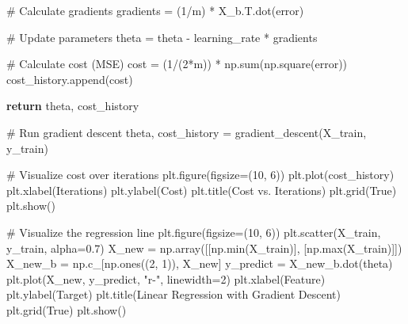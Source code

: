 \documentclass[
  letterpaper,
  DIV=11,
  numbers=noendperiod]{scrreprt}
\newenvironment{Shaded}{\begin{snugshade}}{\end{snugshade}}
\newcommand{\BuiltInTok}[1]{\textcolor[rgb]{0.00,0.23,0.31}{#1}}
\newcommand{\CommentTok}[1]{\textcolor[rgb]{0.37,0.37,0.37}{#1}}
\newcommand{\ControlFlowTok}[1]{\textcolor[rgb]{0.00,0.23,0.31}{\textbf{#1}}}
\newcommand{\DecValTok}[1]{\textcolor[rgb]{0.68,0.00,0.00}{#1}}
\newcommand{\FloatTok}[1]{\textcolor[rgb]{0.68,0.00,0.00}{#1}}
\newcommand{\NormalTok}[1]{\textcolor[rgb]{0.00,0.23,0.31}{#1}}
\newcommand{\OperatorTok}[1]{\textcolor[rgb]{0.37,0.37,0.37}{#1}}
\newcommand{\StringTok}[1]{\textcolor[rgb]{0.13,0.47,0.30}{#1}}
\newcommand{\VariableTok}[1]{\textcolor[rgb]{0.07,0.07,0.07}{#1}}
\begin{document}
\begin{Shaded}
\begin{Highlighting}[]
        \CommentTok{\# Calculate gradients}
\NormalTok{        gradients }\OperatorTok{=}\NormalTok{ (}\DecValTok{1}\OperatorTok{/}\NormalTok{m) }\OperatorTok{*}\NormalTok{ X\_b.T.dot(error)}
        
        \CommentTok{\# Update parameters}
\NormalTok{        theta }\OperatorTok{=}\NormalTok{ theta }\OperatorTok{{-}}\NormalTok{ learning\_rate }\OperatorTok{*}\NormalTok{ gradients}
        
        \CommentTok{\# Calculate cost (MSE)}
\NormalTok{        cost }\OperatorTok{=}\NormalTok{ (}\DecValTok{1}\OperatorTok{/}\NormalTok{(}\DecValTok{2}\OperatorTok{*}\NormalTok{m)) }\OperatorTok{*}\NormalTok{ np.}\BuiltInTok{sum}\NormalTok{(np.square(error))}
\NormalTok{        cost\_history.append(cost)}
        
    \ControlFlowTok{return}\NormalTok{ theta, cost\_history}

\CommentTok{\# Run gradient descent}
\NormalTok{theta, cost\_history }\OperatorTok{=}\NormalTok{ gradient\_descent(X\_train, y\_train)}

\CommentTok{\# Visualize cost over iterations}
\NormalTok{plt.figure(figsize}\OperatorTok{=}\NormalTok{(}\DecValTok{10}\NormalTok{, }\DecValTok{6}\NormalTok{))}
\NormalTok{plt.plot(cost\_history)}
\NormalTok{plt.xlabel(}\StringTok{\textquotesingle{}Iterations\textquotesingle{}}\NormalTok{)}
\NormalTok{plt.ylabel(}\StringTok{\textquotesingle{}Cost\textquotesingle{}}\NormalTok{)}
\NormalTok{plt.title(}\StringTok{\textquotesingle{}Cost vs. Iterations\textquotesingle{}}\NormalTok{)}
\NormalTok{plt.grid(}\VariableTok{True}\NormalTok{)}
\NormalTok{plt.show()}

\CommentTok{\# Visualize the regression line}
\NormalTok{plt.figure(figsize}\OperatorTok{=}\NormalTok{(}\DecValTok{10}\NormalTok{, }\DecValTok{6}\NormalTok{))}
\NormalTok{plt.scatter(X\_train, y\_train, alpha}\OperatorTok{=}\FloatTok{0.7}\NormalTok{)}
\NormalTok{X\_new }\OperatorTok{=}\NormalTok{ np.array([[np.}\BuiltInTok{min}\NormalTok{(X\_train)], [np.}\BuiltInTok{max}\NormalTok{(X\_train)]])}
\NormalTok{X\_new\_b }\OperatorTok{=}\NormalTok{ np.c\_[np.ones((}\DecValTok{2}\NormalTok{, }\DecValTok{1}\NormalTok{)), X\_new]}
\NormalTok{y\_predict }\OperatorTok{=}\NormalTok{ X\_new\_b.dot(theta)}
\NormalTok{plt.plot(X\_new, y\_predict, }\StringTok{"r{-}"}\NormalTok{, linewidth}\OperatorTok{=}\DecValTok{2}\NormalTok{)}
\NormalTok{plt.xlabel(}\StringTok{\textquotesingle{}Feature\textquotesingle{}}\NormalTok{)}
\NormalTok{plt.ylabel(}\StringTok{\textquotesingle{}Target\textquotesingle{}}\NormalTok{)}
\NormalTok{plt.title(}\StringTok{\textquotesingle{}Linear Regression with Gradient Descent\textquotesingle{}}\NormalTok{)}
\NormalTok{plt.grid(}\VariableTok{True}\NormalTok{)}
\NormalTok{plt.show()}


\end{Highlighting}
\end{Shaded}
\end{document}
